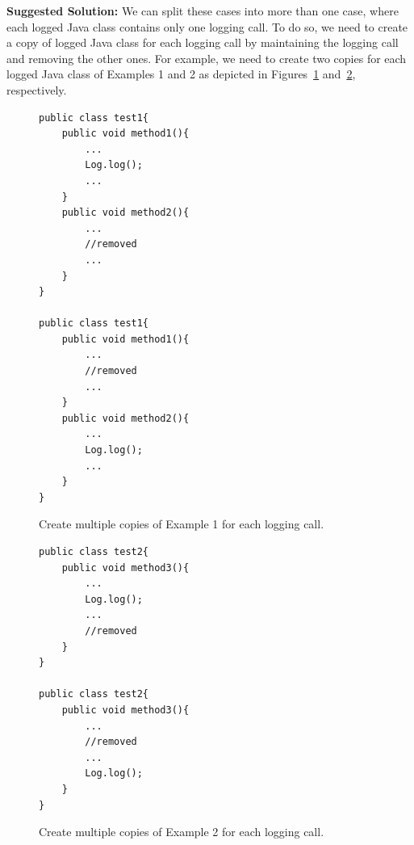 \textbf{Suggested Solution:} We can split these cases into more than one case, where each logged Java class contains only one logging call. To do so, we need to create a copy of logged Java class for each logging call by maintaining the logging call and removing the other ones. For example, we need to create two copies for each logged Java class of Examples 1 and 2 as depicted in Figures~\ref{multiple1-one} and~\ref{multiple2-one}, respectively.


\begin{figure}[H]
\def\baselinestretch{1}
\begin{lstlisting}
public class test1{
	public void method1(){
		...
		Log.log();
		...
	} 
	public void method2(){
		...
		//removed
		...
	} 
}

public class test1{
	public void method1(){
		...
		//removed
		...
	} 
	public void method2(){
		...
		Log.log();
		...
	} 
}

\end{lstlisting}
\caption{Create multiple copies of Example 1 for each logging call.\label{multiple1-one}}
\end{figure}



\begin{figure}[H]
\def\baselinestretch{1}
\begin{lstlisting}
public class test2{
	public void method3(){
		...
		Log.log();
		...
		//removed
	} 
}

public class test2{
	public void method3(){
		...
		//removed
		...
		Log.log();
	} 
}

\end{lstlisting}
\caption{Create multiple copies of Example 2 for each logging call.\label{multiple2-one}}
\end{figure}



